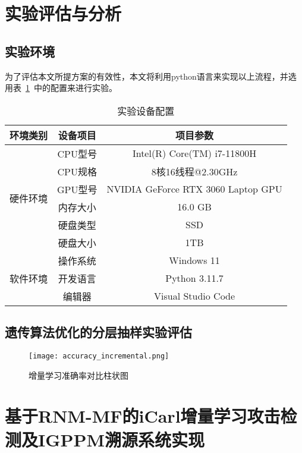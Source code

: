 \section{实验评估与分析}
\subsection{实验环境}
为了评估本文所提方案的有效性，本文将利用python语言来实现以上流程，并选用表~\ref{tab:env_setting}~中的配置来进行实验。
\begin{table}[htbp]
  \caption{实验设备配置}
  \label{tab:env_setting}
  \centering
  \begin{tabular}{ccc}
    \toprule
    \textbf{环境类别} & \textbf{设备项目} & \textbf{项目参数}\\
    \midrule
    \multirow{6}{*}{硬件环境}& CPU型号 & Intel(R) Core(TM) i7-11800H\\
                            & CPU规格 & 8核16线程@2.30GHz\\
                            & GPU型号 & NVIDIA GeForce RTX 3060 Laptop GPU\\
                            & 内存大小& 16.0 GB\\
                            & 硬盘类型& SSD\\
                            & 硬盘大小& 1TB\\
                            \hline
    \multirow{3}{*}{软件环境}&操作系统&Windows 11\\
                            &开发语言&Python 3.11.7\\
                            &编辑器 &Visual Studio Code\\                       
    \bottomrule
  \end{tabular}
\end{table}

\subsection{遗传算法优化的分层抽样实验评估}
\begin{figure}[htbp]
  \centering
  
  \texttt{[image: accuracy\_incremental.png]}
  \caption{增量学习准确率对比柱状图}
  \label{fig:acc_icarl}
\end{figure}

\section{基于RNM-MF的iCarl增量学习攻击检测及IGPPM溯源系统实现}

